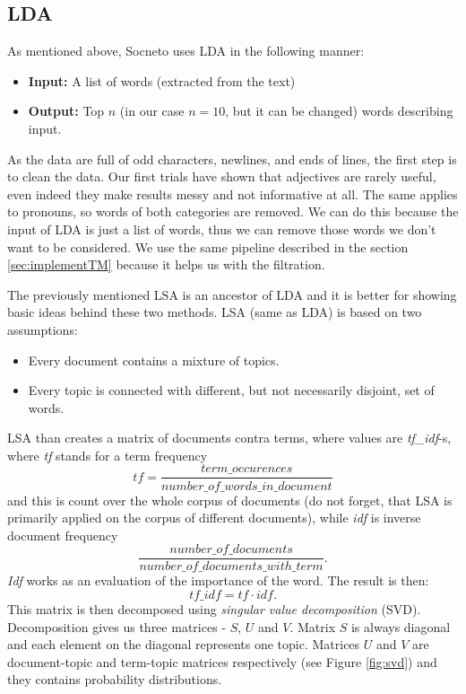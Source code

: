 \subsection{LDA}
As mentioned above, Socneto uses LDA in the following manner:
   \begin{itemize}
      \item \textbf{Input:} A list of words (extracted from the text)
      \item \textbf{Output:} Top $n$ (in our case $n=10$, but it can be changed) words describing input.
    \end{itemize}
As the data are full of odd characters, newlines, and ends of lines, the first step is to clean the data. Our first trials have shown that adjectives are rarely useful, even indeed they make results messy and not informative at all. The same applies to pronouns, so words of both categories are removed. We can do this because the input of LDA is just a list of words, thus we can remove those words we don't want to be considered. We use the same pipeline described in the section \ref{sec:implementTM} because it helps us with the filtration. \par
The previously mentioned LSA is an ancestor of LDA and it is better for showing basic ideas behind these two methods. LSA (same as LDA) is based on two assumptions: 
\begin{itemize}
  \item Every document contains a mixture of topics.
  \item Every topic is connected with different, but not necessarily disjoint, set of words. 
\end{itemize}
LSA than creates a matrix of documents contra terms, where values are \textit{tf\_idf}-s, where \textit{tf} stands for a term frequency
\[ tf = \frac{term\_occurences}{number\_of\_words\_in\_document} \]
and this is count over the whole corpus of documents (do not forget, that LSA is primarily applied on the corpus of different documents), while \textit{idf} is inverse document frequency
\[\frac{number\_of\_documents}{number\_of\_documents\_with\_term}.\]\textit{Idf} works as an evaluation of the importance of the word. The result is then: \[tf\_idf = tf \cdot idf .\] This matrix is then decomposed using \textit{singular value decomposition} (SVD). Decomposition gives us three matrices - $S$, $U$ and $V$. Matrix $S$ is always diagonal and each element on the diagonal represents one topic. Matrices $U$ and $V$ are document-topic and term-topic matrices respectively (see Figure \ref{fig:svd}) and they contains probability distributions. 

